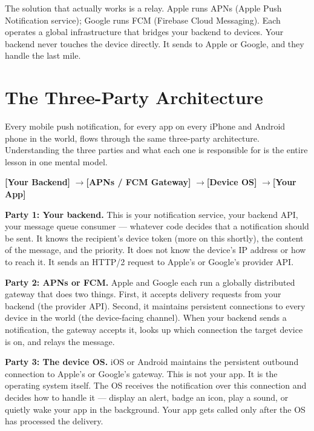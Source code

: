 \documentclass[11pt,a4paper]{article}
\begin{document}
The solution that actually works is a relay. Apple runs APNs (Apple Push Notification service); Google runs FCM (Firebase Cloud Messaging). Each operates a global infrastructure that bridges your backend to devices. Your backend never touches the device directly. It sends to Apple or Google, and they handle the last mile.

\section{The Three-Party Architecture}

Every mobile push notification, for every app on every iPhone and Android phone in the world, flows through the same three-party architecture. Understanding the three parties and what each one is responsible for is the entire lesson in one mental model.

\begin{center}
\textbf{[Your Backend]} \quad$\longrightarrow$\quad \textbf{[APNs / FCM Gateway]} \quad$\longrightarrow$\quad \textbf{[Device OS]} \quad$\longrightarrow$\quad \textbf{[Your App]}
\end{center}

\textbf{Party 1: Your backend.} This is your notification service, your backend API, your message queue consumer --- whatever code decides that a notification should be sent. It knows the recipient's device token (more on this shortly), the content of the message, and the priority. It does not know the device's IP address or how to reach it. It sends an HTTP/2 request to Apple's or Google's provider API.

\textbf{Party 2: APNs or FCM.} Apple and Google each run a globally distributed gateway that does two things. First, it accepts delivery requests from your backend (the provider API). Second, it maintains persistent connections to every device in the world (the device-facing channel). When your backend sends a notification, the gateway accepts it, looks up which connection the target device is on, and relays the message.

\textbf{Party 3: The device OS.} iOS or Android maintains the persistent outbound connection to Apple's or Google's gateway. This is not your app. It is the operating system itself. The OS receives the notification over this connection and decides how to handle it --- display an alert, badge an icon, play a sound, or quietly wake your app in the background. Your app gets called only after the OS has processed the delivery.
\end{document}
